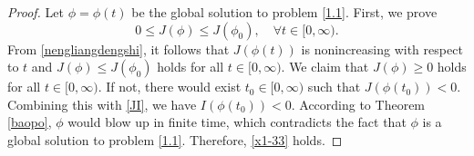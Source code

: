 \documentclass[11pt,a4paper]{article}
\numberwithin{equation}{section}
\numberwithin{remark}{section}
\begin{document}
\begin{proof}
Let $\phi=\phi(t)$ be the global solution to problem \eqref{1.1}.
First, we prove
\begin{equation}\label{x1-33}
0\leq J(\phi)\leq J(\phi_0),\quad \forall t\in[0,\infty).
\end{equation}
From \eqref{nengliangdengshi}, it follows that $J(\phi(t))$ is nonincreasing with respect to $t$ and $J(\phi)\leq J(\phi_0)$ holds for all $t\in[0,\infty)$. We claim that $J(\phi)\geq 0$ holds for all $t\in[0,\infty)$. If not, there would exist $t_0\in[0,\infty)$ such that $J(\phi(t_0))<0$. Combining this with \eqref{JI}, we have $I(\phi(t_0))<0$. According to Theorem \ref{baopo}, $\phi$ would blow up in finite time, which contradicts the fact that $\phi$ is a global solution to problem \eqref{1.1}. Therefore, \eqref{x1-33} holds.


\end{proof}
\end{document}
